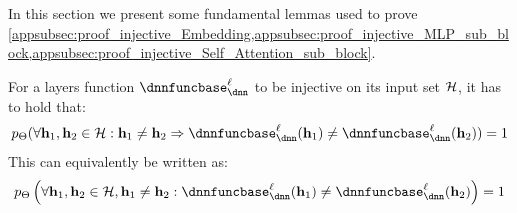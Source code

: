 In this section we present some fundamental lemmas used to prove \cref{appsubsec:proof_injective_Embedding,appsubsec:proof_injective_MLP_sub_block,appsubsec:proof_injective_Self_Attention_sub_block}.

\begin{lemma}\label{theorem:ImplicationRelationCondition}
    For a layers function $\dnnfunclayer{\layer}$ to be injective on its input set $\mathcal{H}$, it has to hold that: 
    \begin{align} \label{eq:lemma_ImplicationRelationCondition_1}
        \prob_{\Parameters}(\forall \hiddenstates_1,\hiddenstates_2\in \InputSet: \hiddenstates_1\neq\hiddenstates_2\Rightarrow \dnnfunclayer{\layer}(\hiddenstates_1)\neq\dnnfunclayer{\layer}(\hiddenstates_2))=1
    \end{align}
    This can equivalently be written as:
    \begin{align} \label{eq:lemma_ImplicationRelationCondition_2}
        \prob_{\Parameters}\left(\forall \hiddenstates_1,\hiddenstates_2\in \InputSet, \hiddenstates_1 \neq \hiddenstates_2: \dnnfunclayer{\layer}(\hiddenstates_1)\neq\dnnfunclayer{\layer}(\hiddenstates_2)  \right)=1
    \end{align}
\end{lemma}
